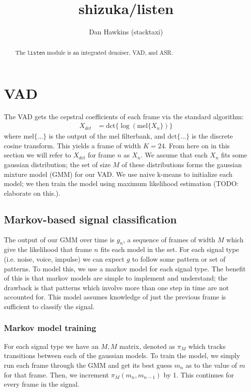 \documentclass{article}
\title{shizuka/listen}
\author{Dan Hawkins (stacktaxi)}
\begin{document}
\maketitle

\begin{abstract}
  The \texttt{listen} module is an integrated denoiser, VAD, and ASR.
\end{abstract}

\section{VAD}
The VAD gets the cepstral coefficients of each frame via the standard algorithm:
\begin{align}
  X_{dct} &= \text{dct}\{\log(\text{mel}\{X_n\})\}
\end{align}
where $\text{mel}\{\ldots\}$ is the output of the mel filterbank, and $\text{dct}\{\ldots\}$ is the discrete cosine transform. This yields a frame of width $K=24$. From here on in this section we will refer to $X_{dct}$ for frame $n$ as $X_n$. We assume that each $X_n$ fits some gaussian distribution; the set of size $M$ of these distributions forms the gaussian mixture model (GMM) for our VAD. We use naive k-means to initialize each model; we then train the model using maximum likelihood estimation (TODO: elaborate on this.).\\

\subsection{Markov-based signal classification}
The output of our GMM over time is $g_n$, a sequence of frames of width $M$ which give the likelihood that frame $n$ fits each model in the set. For each signal type (i.e. noise, voice, impulse) we can expect $g$ to follow some pattern or set of patterns. To model this, we use a markov model for each signal type. The benefit of this is that markov models are simple to implement and understand; the drawback is that patterns which involve more than one step in time are not accounted for. This model assumes knowledge of just the previous frame is sufficient to classify the signal.

\subsubsection{Markov model training}
For each signal type we have an $M,M$ matrix, denoted as $\pi_M$ which tracks transitions between each of the gaussian models. To train the model, we simply run each frame through the GMM and get its best guess $m_n$ as to the value of $m$ for that frame. Then, we increment $\pi_M(m_n,m_{n-1})$ by 1. This continues for every frame in the signal.
\end{document}
